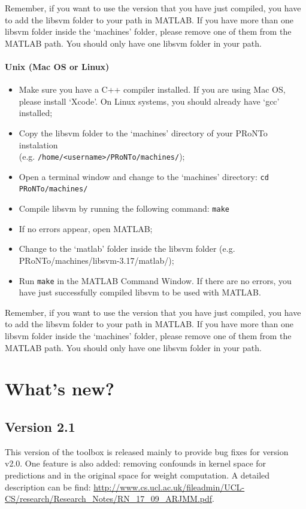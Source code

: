 Remember, if you want to use the version that you have just compiled, you have to add the libsvm folder to your path in MATLAB. If you have more than one libsvm folder inside the `machines' folder, please remove one of them from the MATLAB path. You should only have one libsvm folder in your path.


\paragraph{Unix (Mac OS or Linux)}

\begin{itemize}
    \item Make sure you have a C++ compiler installed. If you are using Mac OS, please install `Xcode'. On Linux systems, you should already have `gcc' installed;
    \item Copy the libsvm folder to the `machines' directory of your PRoNTo instalation\\(e.g. {\tt /home/<username>/PRoNTo/machines/});
    \item Open a terminal window and change to the `machines' directory: {\tt cd PRoNTo/machines/}
    \item Compile libsvm by running the following command: {\tt make}
    \item If no errors appear, open MATLAB;
    \item Change to the `matlab' folder inside the libsvm folder (e.g. PRoNTo/machines/libsvm-3.17/matlab/);
    \item Run {\tt make} in the MATLAB Command Window. If there are no errors, you have just successfully compiled libsvm to be used with MATLAB.
\end{itemize}

Remember, if you want to use the version that you have just compiled, you have to add the libsvm folder to your path in MATLAB. If you have more than one libsvm folder inside the `machines' folder, please remove one of them from the MATLAB path. You should only have one libsvm folder in your path.

\section{What's new?}
\subsection{Version 2.1}
This version of the toolbox is released mainly to provide bug fixes for version v2.0. One feature is also added: removing confounds in kernel space for predictions and in the original space for weight computation. A detailed description can be find: \url{http://www.cs.ucl.ac.uk/fileadmin/UCL-CS/research/Research_Notes/RN_17_09_ARJMM.pdf}. 
